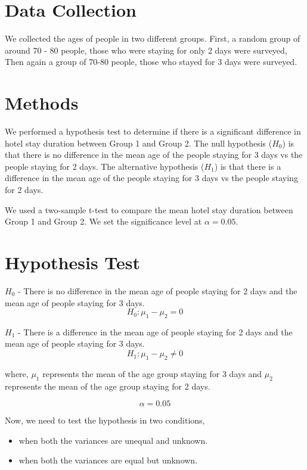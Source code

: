 \documentclass[oneside]{book}
\begin{document}
\section{Data Collection}
We collected the ages of people in two different groups. First, a random group of around 70 - 80 people, those who were staying for only 2 days were surveyed, Then again a group of 70-80 people, those who stayed for 3 days were surveyed. 

\bigskip

\section{Methods}
We performed a hypothesis test to determine if there is a significant difference in hotel stay duration between Group 1 and Group 2. The null hypothesis ($H_0$) is that there is no difference in the mean age of the people staying for 3 days vs the people staying for 2 days. The alternative hypothesis ($H_1$) is that there is a difference in the mean age of the people staying for 3 days vs the people staying for 2 days.

We used a two-sample t-test to compare the mean hotel stay duration between Group 1 and Group 2. We set the significance level at $\alpha = 0.05$.

\section{Hypothesis Test}
\begin{center}
\large $H_0$ - There is no difference in the mean age of people staying for 2 days and the mean age of people staying for 3 days.
\[ H_0: \mu_1 - \mu_2 = 0 \]
\end{center}
\begin{center}
\large $H_1$ - There is a difference in the mean age of people staying for 2 days and the mean age of people staying for 3 days.
\[ H_1: \mu_1 - \mu_2 \neq 0 \]

where, $\mu_1$ represents the mean of the age group staying for 3 days and $\mu_2$ represents the mean of the age group staying for 2 days.
\end{center}

\[ \alpha = 0.05\]

Now, we need to test the hypothesis in two conditions,
\begin{itemize}
    \item when both the variances are unequal and unknown.
    \item when both the variances are equal but unknown.
\end{itemize}
\end{document}
